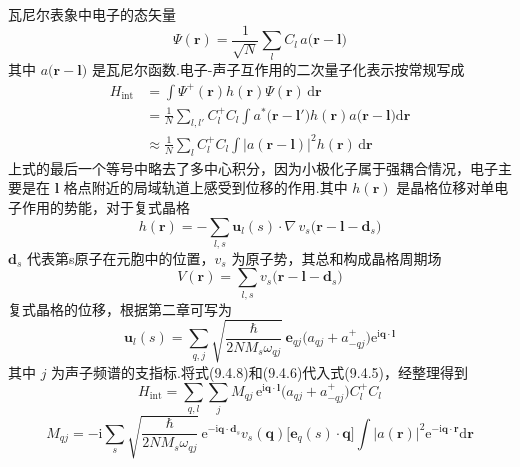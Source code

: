 瓦尼尔表象中电子的态矢量
\begin{equation*}
  \varPsi(\boldsymbol{r})=\frac{1}{\sqrt{N}}\sum_{l}C_{l}\,
  a\bigl(\boldsymbol{r}-\boldsymbol{l}\bigr)
\end{equation*}
其中 $a\bigl(\boldsymbol{r}-\boldsymbol{l}\bigr)$ 是瓦尼尔函数.电子-声子互作用的二次量子化表示按常规写成
\begin{equation}
\begin{aligned}
  H_{\mathrm{int}}&=\int\varPsi^{+}(\boldsymbol{r})h(\boldsymbol{r})
  \varPsi(\boldsymbol{r})\,\mathrm{d}\boldsymbol{r}\\
  &=\frac{1}{N}\sum_{l,l'}C_{l}^{+}C_{l}
  \int a^{*}\bigl(\boldsymbol{r}-\boldsymbol{l}'\bigr)h(\boldsymbol{r})
  a\bigl(\boldsymbol{r}-\boldsymbol{l}\bigr)\mathrm{d}\boldsymbol{r}\\
  &\approx\frac{1}{N}\sum_{l}C_{l}^{+}C_{l}
  \int\bigl|a(\boldsymbol{r}-\boldsymbol{l})\bigr|^{2}h(\boldsymbol{r})\,
  \mathrm{d}\boldsymbol{r}
\end{aligned}
\end{equation}
上式的最后一个等号中略去了多中心积分，因为小极化子属于强耦合情况，电子主要是在 $\boldsymbol{l}$ 格点附近的局域轨道上感受到位移的作用.其中 $h(\boldsymbol{r})$ 是晶格位移对单电子作用的势能，对于复式晶格
\begin{equation}
  h(\boldsymbol{r})=-\sum_{l,s}\boldsymbol{u}_{l}(s)\cdot
  \nabla\,v_{s}\bigl(\boldsymbol{r}-\boldsymbol{l}-\boldsymbol{d}_{s}\bigr)
\end{equation}
$\boldsymbol{d}_{s}$ 代表第s原子在元胞中的位置，$v_{s}$ 为原子势，其总和构成晶格周期场
\begin{equation}
  V(\boldsymbol{r})=\sum_{l,s}v_{s}\bigl(\boldsymbol{r}-\boldsymbol{l}
  -\boldsymbol{d}_{s}\bigr)
\end{equation}
复式晶格的位移，根据第二章可写为
\begin{equation}
  \boldsymbol{u}_{l}(s)=\sum_{q,j}
  \sqrt{\frac{\hbar}{2NM_{s}\omega_{qj}}}\,
  \boldsymbol{e}_{qj}\bigl(a_{qj}+a_{-qj}^{+}\bigr)
  \mathrm{e}^{\mathrm{i}\boldsymbol{q}\cdot\boldsymbol{l}}
\end{equation}
其中 $j$ 为声子频谱的支指标.将式(9.4.8)和(9.4.6)代入式(9.4.5)，经整理得到
\begin{equation}
  H_{\mathrm{int}}=\sum_{q,l}\sum_{j}M_{qj}\,
  \mathrm{e}^{\mathrm{i}\boldsymbol{q}\cdot\boldsymbol{l}}
  \bigl(a_{qj}+a_{-qj}^{+}\bigr)C_{l}^{+}C_{l}
\end{equation}
\begin{equation}
  M_{qj}=-\mathrm{i}\sum_{s}
  \sqrt{\frac{\hbar}{2NM_{s}\omega_{qj}}}\,
  \mathrm{e}^{-\mathrm{i}\boldsymbol{q}\cdot\boldsymbol{d}_{s}}v_{s}(\boldsymbol{q})
  \bigl[\boldsymbol{e}_{q}(s)\cdot\boldsymbol{q}\bigr]
  \int\bigl|a(\boldsymbol{r})\bigr|^{2}
  \mathrm{e}^{-\mathrm{i}\boldsymbol{q}\cdot\boldsymbol{r}}\mathrm{d}\boldsymbol{r}
\end{equation}
